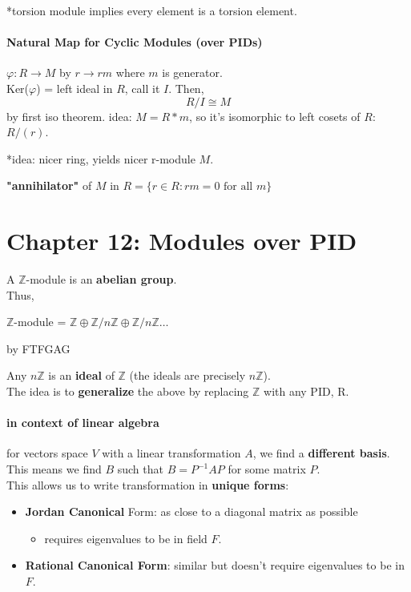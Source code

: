 \documentclass[12pt]{article}
\def\Z{\ensuremath{\mathbb{Z}}}
\newcommand{\bt}[1]{\textbf{#1}} %
\newcommand{\gray}[1]{\textcolor[gray]{0.5}{#1}} %
\begin{document}
*torsion module implies every element is a torsion element.\\

\subsection*{Natural Map for Cyclic Modules (over PIDs)}
$\varphi: R \rightarrow M$ by $r \rightarrow r m$ where $m$ is generator.\\

Ker($\varphi$) = left ideal in $R$, call it $I$. 
Then, 
$$R / I \cong M$$
by first iso theorem. 
\gray{idea: $M = R*m$, so it's isomorphic to left cosets of $R$: $R / (r)$.}

*idea: nicer ring, yields nicer r-module $M$.

\bt{"annihilator"} of $M$ in $R = \{r \in R : r m = 0 \text{ for all } m\}$ 

\part*{Chapter 12: Modules over PID}

A $\Z$-module is an \bt{abelian group}.\\
Thus, \\
\centerline{$\Z$-module = $\Z \oplus \Z / n \Z \oplus \Z / n \Z \dots$}
\gray{by FTFGAG}

Any $n \Z$ is an \bt{ideal} of $\Z$ (the ideals are precisely $n \Z$).\\

The idea is to \bt{generalize} the above by replacing $\Z$ with any PID, R.\\


\subsection*{in context of linear algebra}
for vectors space $V$  with a linear transformation $A$, we find a \bt{different basis}.\\
This means we find $B$ such that $B = P^{-1} A P$ for some matrix $P$.\\
This  allows us to write transformation in \bt{unique forms}: 
\begin{itemize}
    \item \bt{Jordan Canonical} Form: as close to a diagonal matrix as possible
    \begin{itemize}
        \item requires eigenvalues to be in field $F$.
    \end{itemize}
    \item \bt{Rational Canonical Form}: similar but doesn't require eigenvalues to be in $F$.
\end{itemize}
\end{document}
